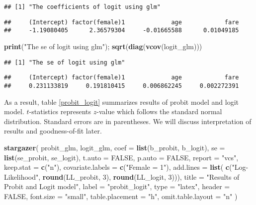 \documentclass[
  12pt,
]{article}
\newenvironment{Shaded}{\begin{snugshade}}{\end{snugshade}}
\newcommand{\DataTypeTok}[1]{\textcolor[rgb]{0.13,0.29,0.53}{#1}}
\newcommand{\DecValTok}[1]{\textcolor[rgb]{0.00,0.00,0.81}{#1}}
\newcommand{\KeywordTok}[1]{\textcolor[rgb]{0.13,0.29,0.53}{\textbf{#1}}}
\newcommand{\NormalTok}[1]{#1}
\newcommand{\OtherTok}[1]{\textcolor[rgb]{0.56,0.35,0.01}{#1}}
\newcommand{\StringTok}[1]{\textcolor[rgb]{0.31,0.60,0.02}{#1}}
\begin{document}
\begin{verbatim}
## [1] "The coefficients of logit using glm"
\end{verbatim}

\begin{verbatim}
##     (Intercept) factor(female)1             age            fare 
##     -1.19080405      2.36579304     -0.01665588      0.01049185
\end{verbatim}

\begin{Shaded}
\begin{Highlighting}[]
\KeywordTok{print}\NormalTok{(}\StringTok{"The se of logit using glm"}\NormalTok{); }\KeywordTok{sqrt}\NormalTok{(}\KeywordTok{diag}\NormalTok{(}\KeywordTok{vcov}\NormalTok{(logit\_glm)))}
\end{Highlighting}
\end{Shaded}

\begin{verbatim}
## [1] "The se of logit using glm"
\end{verbatim}

\begin{verbatim}
##     (Intercept) factor(female)1             age            fare 
##     0.231133819     0.191810415     0.006862245     0.002272391
\end{verbatim}

As a result, table \ref{probit_logit} summarizes results of probit model
and logit model. \(t\)-statistics represents \(z\)-value which follows
the standard normal distribution. Standard errors are in parentheses. We
will discuss interpretation of results and goodness-of-fit later.

\begin{Shaded}
\begin{Highlighting}[]
\KeywordTok{stargazer}\NormalTok{(}
\NormalTok{  probit\_glm, logit\_glm,}
  \DataTypeTok{coef =} \KeywordTok{list}\NormalTok{(b\_probit, b\_logit), }\DataTypeTok{se =} \KeywordTok{list}\NormalTok{(se\_probit, se\_logit),}
  \DataTypeTok{t.auto =} \OtherTok{FALSE}\NormalTok{, }\DataTypeTok{p.auto =} \OtherTok{FALSE}\NormalTok{,}
  \DataTypeTok{report =} \StringTok{"vcs"}\NormalTok{, }\DataTypeTok{keep.stat =} \KeywordTok{c}\NormalTok{(}\StringTok{"n"}\NormalTok{),}
  \DataTypeTok{covariate.labels =} \KeywordTok{c}\NormalTok{(}\StringTok{"Female = 1"}\NormalTok{),}
  \DataTypeTok{add.lines =} \KeywordTok{list}\NormalTok{(}
    \KeywordTok{c}\NormalTok{(}\StringTok{"Log{-}Likelihood"}\NormalTok{, }\KeywordTok{round}\NormalTok{(LL\_probit, }\DecValTok{3}\NormalTok{), }\KeywordTok{round}\NormalTok{(LL\_logit, }\DecValTok{3}\NormalTok{))),}
  \DataTypeTok{title =} \StringTok{"Results of Probit and Logit model"}\NormalTok{,}
  \DataTypeTok{label =} \StringTok{"probit\_logit"}\NormalTok{,}
  \DataTypeTok{type =} \StringTok{"latex"}\NormalTok{, }\DataTypeTok{header =} \OtherTok{FALSE}\NormalTok{, }\DataTypeTok{font.size =} \StringTok{"small"}\NormalTok{,}
  \DataTypeTok{table.placement =} \StringTok{"h"}\NormalTok{, }\DataTypeTok{omit.table.layout =} \StringTok{"n"}
\NormalTok{)}
\end{Highlighting}
\end{Shaded}
\end{document}
